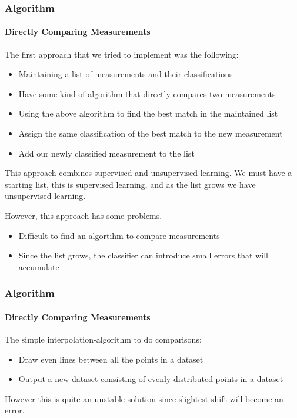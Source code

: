 \documentclass{beamer}
\begin{document}
\begin{frame}[shrink]
\frametitle{Algorithm}
\framesubtitle{Directly Comparing Measurements}

The first approach that we tried to implement was the following:

\begin{itemize}
\pause
\item{Maintaining a list of measurements and their classifications}
\pause
\item{Have some kind of algorithm that directly compares two measurements}
\pause
\item{Using the above algorithm to find the best match in the maintained list}
\pause
\item{Assign the same classification of the best match to the new measurement}
\pause
\item{Add our newly classified measurement to the list}
\end{itemize}

\pause
This approach combines supervised and unsupervised learning. We must have a starting list, this is supervised learning, and as the list grows we have unsupervised learning.

\pause
\vspace{10pt}

However, this approach has some problems.

\begin{itemize}
\pause
\item{Difficult to find an algortihm to compare measurements}
\pause
\item{Since the list grows, the classifier can introduce small errors that will accumulate}
\end{itemize}

\end{frame}

\begin{frame}
\frametitle{Algorithm}
\framesubtitle{Directly Comparing Measurements}

The simple interpolation-algorithm to do comparisons:

\begin{itemize}
\pause
\item{Draw even lines between all the points in a dataset}
\pause
\item{Output a new dataset consisting of evenly distributed points in a dataset}
\end{itemize}

\pause
However this is quite an unstable solution since slightest shift will become an error.


\end{frame}
\end{document}
